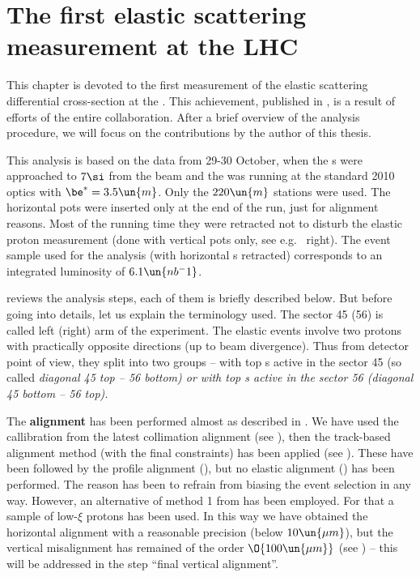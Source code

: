 \iffalse
DPE, SD, MC
\fi

\chapter[felm]{The first elastic scattering measurement at the LHC}

This chapter is devoted to the first measurement of the elastic scattering differential cross-section at the . This achievement, published in , is a result of efforts of the entire  collaboration. After a brief overview of the analysis procedure, we will focus on the contributions by the author of this thesis.

This analysis is based on the data from 29-30 October, when the s were approached to $7\si$ from the beam and the  was running at the standard 2010 optics with $\be^* = 3.5\un{m}$. Only the $220\un{m}$ stations were used. The horizontal pots were inserted only at the end of the run, just for alignment reasons. Most of the running time they were retracted not to disturb the elastic proton measurement (done with vertical pots only, see e.g.~ right). The event sample used for the analysis (with horizontal s retracted) corresponds to an integrated luminosity of $6.1\un{nb^-1}$.


 reviews the analysis steps, each of them is briefly described below. But before going into details, let us explain the terminology used. The sector 45 (56) is called left (right) arm of the  experiment. The elastic events involve two protons with practically opposite directions (up to beam divergence). Thus from detector point of view, they split into two groups -- with top s active in the sector 45 (so called \em{diagonal} 45 top -- 56 bottom) or with top s active in the sector 56 (diagonal 45 bottom -- 56 top).

\> The {\bf alignment} has been performed almost as described in . We have used the  callibration from the latest collimation alignment (see ), then the track-based alignment method (with the final constraints) has been applied (see ). These have been followed by the profile alignment (), but no elastic alignment () has  been performed. The reason has been to refrain from biasing the event selection in any way. However, an alternative of method 1 from  has been employed. For that a sample of low-$\xi$ protons has been used. In this way we have obtained the horizontal alignment with a reasonable precision (below $10\un{\mu m}$), but the vertical misalignment has remained of the order $\O{100\un{\mu m}}$ (see ) -- this will be addressed in the step ``final vertical alignment''.


